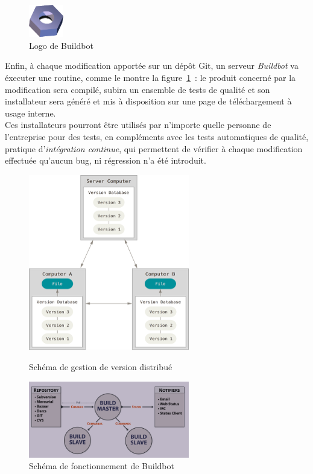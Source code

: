 \paragraph{}
\begin{figure}
  \centering
  \includegraphics[width=1.5cm]{images/buildbot-logo.png}
  \caption{Logo de Buildbot}
\end{figure}
Enfin, à chaque modification apportée sur un dépôt Git, un serveur \emph{Buildbot} va éxecuter
une routine, comme le montre la figure~\ref{buildbot-diagram}~: le produit concerné par la modification sera
compilé, subira un ensemble de tests de qualité et son installateur sera généré 
et mis à disposition sur une page de téléchargement à usage interne.\\
Ces installateurs pourront être utilisés par n'importe quelle personne de l'entreprise
pour des tests, en compléments avec les tests automatiques de qualité, pratique d'\emph{intégration continue},
qui permettent de vérifier à chaque modification effectuée qu'aucun bug, ni régression n'a été 
introduit\cite{integration-continue}.
\begin{figure}
  \centering
  \begin{minipage}[b]{0.4\textwidth}
    \centering
    \includegraphics[width=7cm]{images/git-diagram.png}
    \caption{Schéma de gestion de version distribué\cite{pro-git}}
    \label{git-diagram}
  \end{minipage}%
  \hspace{0.09\textwidth}
  \begin{minipage}[b]{0.4\textwidth}
    \centering
    \includegraphics[width=7cm]{images/buildbot-diagram.png}
    \caption{Schéma de fonctionnement de Buildbot\cite{buildbot}}
    \label{buildbot-diagram}
  \end{minipage}
\end{figure}

